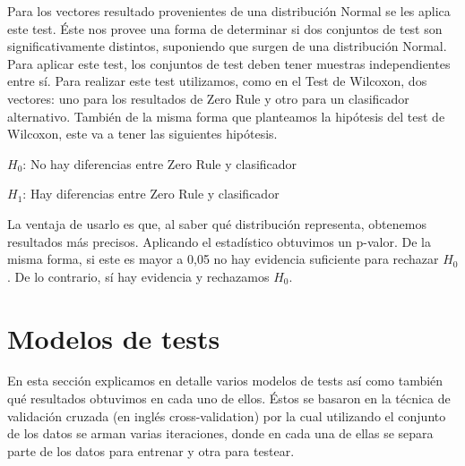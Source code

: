 
Para los vectores resultado provenientes de una distribución Normal se les aplica este test. Éste nos provee una forma de determinar si dos conjuntos de test son significativamente distintos, suponiendo que surgen de una distribución Normal.
Para aplicar este test, los conjuntos de test deben tener muestras independientes entre sí. Para realizar este test utilizamos, como en el Test de Wilcoxon, dos vectores: uno para los resultados de Zero Rule y otro para un clasificador alternativo. 
También de la misma forma que planteamos la hipótesis del test de Wilcoxon, este va a tener las siguientes hipótesis. 

\vspace{0.5cm}
\hspace{2cm}$H_0$: No hay diferencias entre Zero Rule y clasificador
\vspace{0.25cm}

\hspace{2cm}$H_1$: Hay diferencias entre Zero Rule y clasificador
\vspace{0.5cm}

La ventaja de usarlo es que, al saber qué distribución representa, obtenemos resultados más precisos. Aplicando el estadístico obtuvimos un p-valor. De la misma forma, si este es mayor a 0,05 no hay evidencia suficiente para rechazar $H_0$. De lo contrario, sí hay evidencia y rechazamos $H_0$.

\section{Modelos de tests}

En esta sección explicamos en detalle varios modelos de tests así como también qué resultados obtuvimos en cada uno de ellos. Éstos se basaron en la técnica de validación cruzada (en inglés cross-validation) por la cual utilizando el conjunto de los datos se arman varias iteraciones, donde en cada una de ellas se separa parte de los datos para entrenar y otra para testear. 

